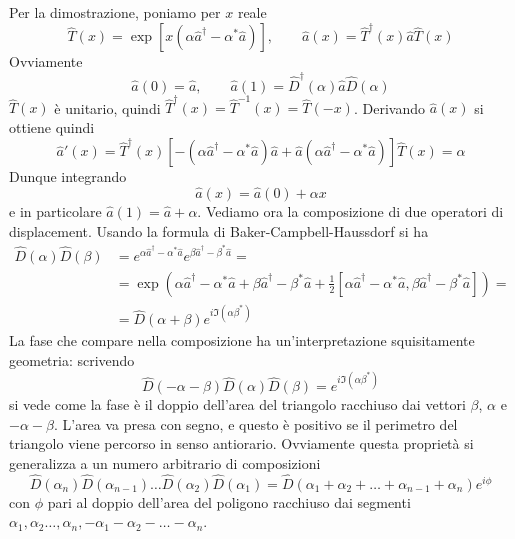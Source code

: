 \documentclass[a4paper, 11pt]{article}
\begin{document}
Per la dimostrazione, poniamo per $x$ reale
\[\hat T(x)=\exp[x(\alpha \hat a^\dagger-\alpha^*\hat a)],\qquad \hat a(x)=\hat T^\dagger(x)\hat a\hat T(x)\]
Ovviamente
\[\hat a(0)=\hat a,\qquad \hat a(1)=\hat D^\dagger(\alpha)\hat a\hat D(\alpha)\]
$\hat T(x)$ è unitario, quindi $\hat T^\dagger(x)=\hat T^{-1}(x)=\hat T(-x)$. Derivando $\hat a(x)$ si ottiene quindi
\[\hat a'(x)=\hat T^\dagger(x)\left[-(\alpha \hat a^\dagger-\alpha^*\hat a)\hat a+\hat a(\alpha \hat a^\dagger-\alpha^*\hat a)\right]\hat T(x)=\alpha\]
Dunque integrando
\[\hat a(x)=\hat a(0)+\alpha x\]
e in particolare $\hat a(1)=\hat a+\alpha$. Vediamo ora la composizione di due operatori di displacement. Usando la formula di Baker-Campbell-Haussdorf si ha
\begin{align*}
	\hat D(\alpha)\hat D(\beta)&=e^{\alpha \hat a^\dagger-\alpha^*\hat a}e^{\beta \hat a^\dagger-\beta^*\hat a}=\\&=\exp\left(\alpha \hat a^\dagger-\alpha^*\hat a+\beta \hat a^\dagger-\beta^*\hat a+\frac{1}{2}[\alpha \hat a^\dagger-\alpha^*\hat a,\beta \hat a^\dagger-\beta^*\hat a]\right)=\\&=\hat D(\alpha+\beta)e^{i\Im(\alpha\beta^*)}
\end{align*}
La fase che compare nella composizione ha un'interpretazione squisitamente geometria: scrivendo 
\[\hat D(-\alpha-\beta)\hat D(\alpha)\hat D(\beta)=e^{i\Im(\alpha\beta^*)}\]
si vede come la fase è il doppio dell'area del triangolo racchiuso dai vettori $\beta$, $\alpha$ e $-\alpha-\beta$. L'area va presa con segno, e questo è positivo se il perimetro del triangolo viene percorso in senso antiorario. Ovviamente questa proprietà si generalizza a un numero arbitrario di composizioni
\[\hat D(\alpha_n)\hat D(\alpha_{n-1})\dots \hat D(\alpha_2)\hat D(\alpha_1)=\hat D(\alpha_1+\alpha_2+\dots+\alpha_{n-1}+\alpha_n)e^{i\phi}\]
con $\phi$ pari al doppio dell'area del poligono racchiuso dai segmenti $\alpha_1,\alpha_2\dots,\alpha_n,-\alpha_1-\alpha_2-\dots-\alpha_n$.
\end{document}
